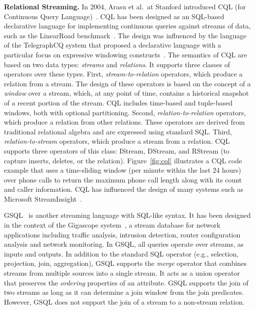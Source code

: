 \textbf{Relational Streaming.}
In 2004, Arasu et al.\ at Stanford introduced CQL (for Continuous
Query Language)~\cite{arasu_widom_2004}. CQL has been designed as an
SQL-based declarative language for implementing continuous queries
against streams of data, such as the LinearRoad
benchmark~\cite{arasu_et_al_2004}. The design was influenced by the language of
the TelegraphCQ system that proposed a declarative language with a
particular focus on expressive windowing
constructs~\cite{chandrasekaran_et_al_2003}. The semantics of CQL are
based on two data types: \emph{streams} and \emph{relations}. It
supports three classes of operators over these types. First,
\emph{stream-to-relation} operators, which produce a relation from a
stream.  The design of these operators is based on the concept of a
\emph{window} over a stream, which, at any point of time, contains a
historical snapshot of a recent portion of the stream. CQL includes
time-based and tuple-based windows, both with optional
partitioning. Second, \emph{relation-to-relation} operators, which
produce a relation from other relations. These operators are derived
from traditional relational algebra and are expressed using standard
SQL. Third, \emph{relation-to-stream} operators, which produce a
stream from a relation. CQL supports three operators of this class:
IStream, DStream, and RStream (to capture inserts, deletes, or the
relation).  Figure~\ref{fig:cql} illustrates a CQL code example that
uses a time-sliding window (per minute within the last 24 hours) over
phone calls to return the maximum phone call length along with its
count and caller information. CQL has influenced the design of many
systems such as Microsoft StreamInsight~\cite{ali_et_al_2009}.

GSQL~\cite{cranor_et_al_2003} is another streaming  language with SQL-like syntax.
It has been designed in the context of the Gigascope system~\cite{cranor2003gigascope}, a stream database for network applications
including traffic analysis, intrusion detection, router configuration analysis and network monitoring.
In GSQL, all queries operate over streams, as inputs and outputs. 
In addition to the standard SQL operator (e.g., selection, projection, join, aggregation), GSQL supports  the \emph{merge} operator that combines streams from multiple sources into a single stream. It acts as a union operator that preserves the \emph{ordering} properties of an attribute.
GSQL supports the join of two streams as long as it can determine
a join window from the join predicates. However, GSQL does
not support the join of a stream to a non-stream relation.


